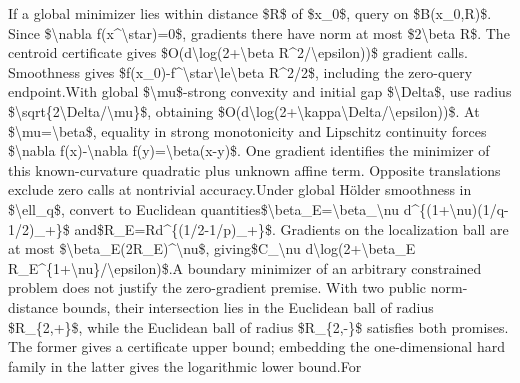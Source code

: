 \documentclass[10pt,a4paper]{article}
\begin{document}
\begingroup\raggedright\sloppy If a global minimizer lies within distance \$R\$ of \$x\_\allowbreak{}0\$,\allowbreak{} query on \$B(x\_\allowbreak{}0,\allowbreak{}R)\$. Since \$\textbackslash{}nabla f(x\textasciicircum{}\textbackslash{}star)=\allowbreak{}0\$,\allowbreak{} gradients there have norm at most \$2\textbackslash{}beta R\$. The centroid certificate gives \$O(d\textbackslash{}log(2+\textbackslash{}beta R\textasciicircum{}2/\allowbreak{}\textbackslash{}epsilon))\$ gradient calls. Smoothness gives \$f(x\_\allowbreak{}0)-f\textasciicircum{}\textbackslash{}star\textbackslash{}le\textbackslash{}beta R\textasciicircum{}2/\allowbreak{}2\$,\allowbreak{} including the zero-query endpoint.\newline{}\newline{}With global \$\textbackslash{}mu\$-strong convexity and initial gap \$\textbackslash{}Delta\$,\allowbreak{} use radius \$\textbackslash{}sqrt\{2\textbackslash{}Delta/\allowbreak{}\textbackslash{}mu\}\$,\allowbreak{} obtaining \$O(d\textbackslash{}log(2+\textbackslash{}kappa\textbackslash{}Delta/\allowbreak{}\textbackslash{}epsilon))\$. At \$\textbackslash{}mu=\allowbreak{}\textbackslash{}beta\$,\allowbreak{} equality in strong monotonicity and Lipschitz continuity forces \$\textbackslash{}nabla f(x)-\textbackslash{}nabla f(y)=\allowbreak{}\textbackslash{}beta(x-y)\$. One gradient identifies the minimizer of this known-curvature quadratic plus unknown affine term. Opposite translations exclude zero calls at nontrivial accuracy.\newline{}\newline{}Under global H{\AtlasUnicodeText ö}\allowbreak{}lder smoothness in \$\textbackslash{}ell\_\allowbreak{}q\$,\allowbreak{} convert to Euclidean quantities\newline{}\$\textbackslash{}beta\_\allowbreak{}E=\allowbreak{}\textbackslash{}beta\_\allowbreak{}\textbackslash{}nu d\textasciicircum{}\{(1+\textbackslash{}nu)(1/\allowbreak{}q-1/\allowbreak{}2)\_\allowbreak{}+\}\$ and\newline{}\$R\_\allowbreak{}E=\allowbreak{}Rd\textasciicircum{}\{(1/\allowbreak{}2-1/\allowbreak{}p)\_\allowbreak{}+\}\$. Gradients on the localization ball are at most \$\textbackslash{}beta\_\allowbreak{}E(2R\_\allowbreak{}E)\textasciicircum{}\textbackslash{}nu\$,\allowbreak{} giving\newline{}\$C\_\allowbreak{}\textbackslash{}nu d\textbackslash{}log(2+\textbackslash{}beta\_\allowbreak{}E R\_\allowbreak{}E\textasciicircum{}\{1+\textbackslash{}nu\}/\allowbreak{}\textbackslash{}epsilon)\$.\newline{}A boundary minimizer of an arbitrary constrained problem does not justify the zero-gradient premise. With two public norm-distance bounds,\allowbreak{} their intersection lies in the Euclidean ball of radius \$R\_\allowbreak{}\{2,\allowbreak{}+\}\$,\allowbreak{} while the Euclidean ball of radius \$R\_\allowbreak{}\{2,\allowbreak{}-\}\$ satisfies both promises. The former gives a certificate upper bound;\allowbreak{} embedding the one-dimensional hard family in the latter gives the logarithmic lower bound.\newline{}\newline{}For 
\end{document}
